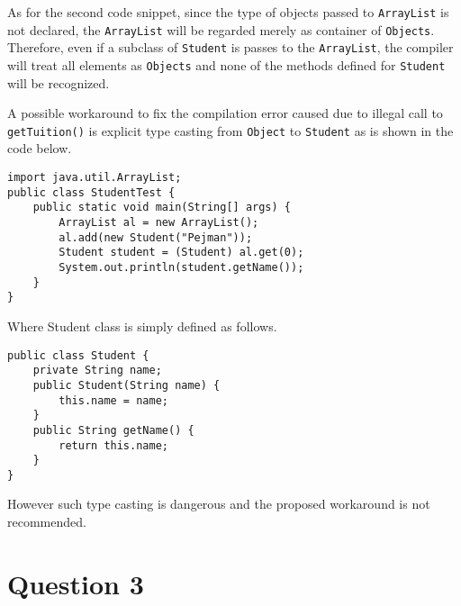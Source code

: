 As for the second code snippet, since the type of objects passed to \texttt{ArrayList} is not declared, the \texttt{ArrayList} will be regarded merely as container of \texttt{Objects}.
Therefore, even if a subclass of \texttt{Student} is passes to the \texttt{ArrayList}, the compiler will treat all elements as \texttt{Objects} and none of the methods defined for \texttt{Student} will be recognized.

A possible workaround to fix the compilation error caused due to illegal call to \texttt{getTuition()} is explicit type casting from \texttt{Object} to \texttt{Student} as is shown in the code below.

\begin{lstlisting}
import java.util.ArrayList;
public class StudentTest {
	public static void main(String[] args) {
		ArrayList al = new ArrayList();
		al.add(new Student("Pejman"));
		Student student = (Student) al.get(0);
		System.out.println(student.getName());
	}
}
\end{lstlisting}

Where Student class is simply defined as follows.

\begin{lstlisting}
public class Student {
	private String name;
	public Student(String name) {
		this.name = name;
	}
	public String getName() {
		return this.name;
	}
}
\end{lstlisting}

However such type casting is dangerous and the proposed workaround is not recommended.

\section{Question 3}
